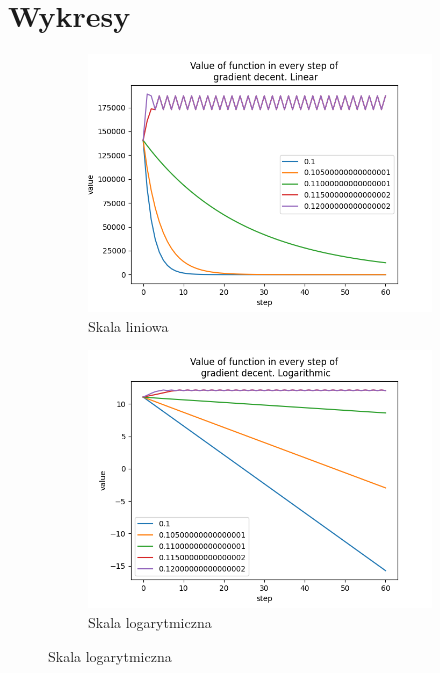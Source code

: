 	\section{Wykresy}

\begin{figure}[h!]
	\centering
	\begin{subfigure}[b]{0.3\linewidth}
		\includegraphics[width=\linewidth]{photos/booth_vals_lin.png}
		\caption{Skala liniowa}
	\end{subfigure}
	\begin{subfigure}[b]{0.3\linewidth}
		\includegraphics[width=\linewidth]{photos/booth_vals_log.png}
		\caption{Skala logarytmiczna}
	\end{subfigure}

\end{figure}

